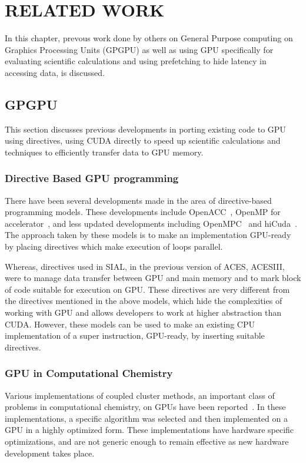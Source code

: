 \chapter{RELATED WORK}\label{lit}
In this chapter, prevous work done by others on General Purpose computing on Graphics Processing
Units (GPGPU) as well as using GPU specifically for evaluating scientific calculations
and using prefetching to hide latency in accessing data, is discussed.

\section{GPGPU}
This section discusses previous developments in porting existing
code to GPU using directives, using CUDA directly to speed up scientific calculations and
techniques to efficiently transfer data to GPU memory.

\subsection{Directive Based GPU programming}
There have been several developments made in the area of directive-based programming models. These
developments include OpenACC~\cite{openacc}, OpenMP for
accelerator~\cite{openmpforaccelerators}, and less updated developments including
OpenMPC~\cite{openmpc} and hiCuda~\cite{hicuda}. The approach taken by these models
is to make an implementation GPU-ready by placing directives which make
execution of loops parallel.

Whereas, directives used in SIAL, in the previous version of ACES, ACESIII, were to manage
data transfer between GPU and main memory and to mark block of code suitable for
execution on GPU. These directives are very different from the directives mentioned
in the above models, which hide the complexities of working with GPU and allows
developers to work at higher abstraction than CUDA.
However, these models can be used to make an existing CPU implementation
of a super instruction, GPU-ready, by inserting suitable directives.

\subsection{GPU in Computational Chemistry}
Various implementations of coupled cluster methods, an important class of problems
in computational chemistry,
on GPUs have been reported~\cite{bhaskar2013}\cite{deprince2011}\cite{maw2011}. In these
implementations, a specific algorithm was selected and then implemented on a
GPU in a highly optimized form. These implementations have hardware specific
optimizations, and are not generic enough to remain effective as new hardware
development takes place.

